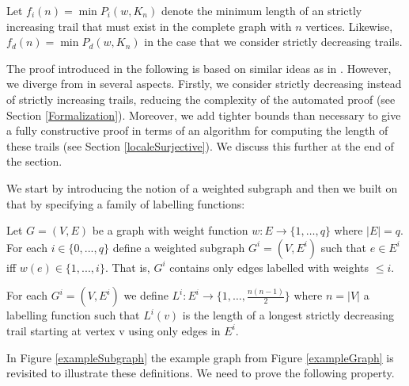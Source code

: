 \begin{isabellebody}
\begin{isamarkuptext}
Let $f_i(n) = \min P_i(w,K_n)$ denote the minimum length of an strictly increasing trail that must exist in 
the complete graph with $n$ vertices. Likewise, $f_d(n) = \min P_d(w,K_n)$ in the case that we consider 
strictly decreasing trails.%
\end{isamarkuptext}\isamarkuptrue%
%
\isadelimdocument
%
\endisadelimdocument
%
\isatagdocument
%
\isamarkuptrue%
%
\endisatagdocument
{\isafolddocument}%
%
\isadelimdocument
%
\endisadelimdocument
%
\begin{isamarkuptext}%
\label{PaperProof}
The proof introduced in the following is based on similar ideas as in \cite{graham1973increasing}. 
However, we diverge from \cite{graham1973increasing} in several aspects. Firstly, we consider strictly decreasing instead of strictly increasing trails,
reducing the complexity of the automated proof (see Section \ref{Formalization}). 
Moreover, we add tighter bounds than necessary to give a fully constructive proof in terms of an algorithm for computing
the length of these trails (see Section \ref{localeSurjective}). We discuss this further at the end of the section.

We start by introducing the notion of a weighted subgraph and then we built on that by specifying a family of labelling functions:

\begin{definition} \label{WeightedSG}
	Let $G=(V,E)$ be a graph with weight function $w:E\rightarrow \{1,\ldots,q\}$ where $|E| = q$.
	For each $i\in \{0,...,q\}$ define a weighted subgraph $G^i = (V,E^i)$ such that $e\in E^i$ iff $w(e)\in \{1,...,i\}$. 
  That is, $G^i$ contains only edges labelled with weights $\le i$.
\end{definition}

\begin{definition}\label{Labelling}
	For each $G^i=(V,E^i)$ we define $L^i:E^i\rightarrow \{1,\ldots,\frac{n(n-1)}{2}\}$ where $n = |V|$ a labelling function such 
that $L^i(v)$ is the length of a longest strictly decreasing trail starting at vertex v using only edges in $E^i$.
\end{definition}

\noindent In Figure \ref{exampleSubgraph} the example graph from Figure \ref{exampleGraph} is revisited to 
illustrate these definitions. We need to prove the following property.

\begin{figure}
\centering


\end{figure}
\end{isamarkuptext}
\end{isabellebody}
